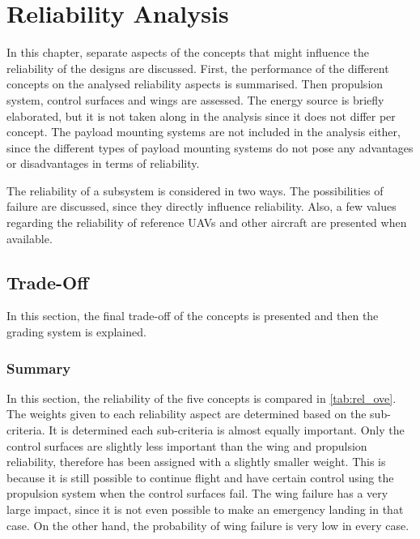 \chapter{Reliability Analysis}\label{ch:relianal}

In this chapter, separate aspects of the concepts that might influence the reliability of the designs are discussed. First, the performance of the different concepts on the analysed reliability aspects is summarised. Then propulsion system, control surfaces and wings are assessed. The energy source is briefly elaborated, but it is not taken along in the analysis since it does not differ per concept. The payload mounting systems are not included in the analysis either, since the different types of payload mounting systems do not pose any advantages or disadvantages in terms of reliability. 

The reliability of a subsystem is considered in two ways. The possibilities of failure are discussed, since they directly influence reliability. Also, a few values regarding the reliability of reference UAVs and other aircraft are presented when available.

\section{Trade-Off}
In this section, the final trade-off of the concepts is presented and then the grading system is explained. 

\subsection{Summary}
In this section, the reliability of the five concepts is compared in \autoref{tab:rel_ove}. The weights given to each reliability aspect are determined based on the sub-criteria. It is determined each sub-criteria is almost equally important. Only the control surfaces are slightly less important than the wing and propulsion reliability, therefore has been assigned with a slightly smaller weight. This is because it is still possible to continue flight and have certain control using the propulsion system when the control surfaces fail. The wing failure has a very large impact, since it is not even possible to make an emergency landing in that case. On the other hand, the probability of wing failure is very low in every case.

